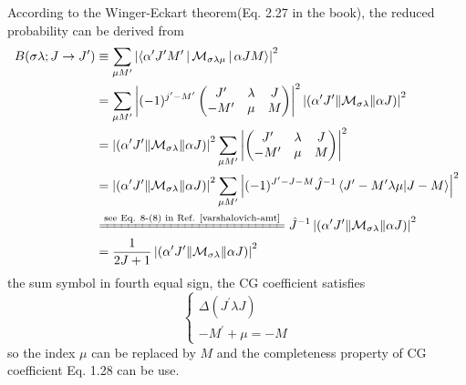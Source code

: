 \begin{exercise}
    According to the Winger-Eckart theorem(Eq. 2.27 in the book), 
    the reduced probability can be derived from
    \begin{equation}
    \begin{aligned}
        B(\sigma\lambda; J \rightarrow J^{\prime})
        &\equiv
        \sum_{\mu M^{\prime}} \left|
            \Braket{\alpha^{\prime} J^{\prime} M^{\prime} |
            \mathcal{M}_{\sigma\lambda\mu} | \alpha J M}
        \right|^2 \\
        &= \sum_{\mu M^{\prime}} \left|
        (-1)^{j^{\prime} - M^{\prime}}\begin{pmatrix}
            J^{\prime}  &  \lambda  &  J \\
            -M^{\prime} &  \mu      &  M 
        \end{pmatrix}
        \right|^2 \left|
          \left(\alpha^{\prime} J^{\prime} \| \mathcal{M}_{\sigma\lambda} \|  \alpha J\right)
        \right|^2 \\
        &= \left|
            \left(\alpha^{\prime} J^{\prime} \| \mathcal{M}_{\sigma\lambda} \|  \alpha J\right)
          \right|^2
          \sum_{\mu M^{\prime}} \left|\begin{pmatrix}
            J^{\prime}  &  \lambda  &  J \\
            -M^{\prime} &  \mu      &  M 
        \end{pmatrix}
        \right|^2  \\ 
        &= \left|
            \left(\alpha^{\prime} J^{\prime} \| \mathcal{M}_{\sigma\lambda} \|  \alpha J\right)
          \right|^2
          \sum_{\mu M^{\prime}} \left|
            (-1)^{J^{\prime} - J - M} \hat{J}^{-1}
            \braket{J^{\prime} -M^{\prime} \lambda \mu | J -M}
        \right|^2  \\
        &\xlongequal[]{\text{see Eq. 8-(8) in Ref. \cite{varshalovich-amt}}}
        \hat{J}^{-1} \left|
            \left(\alpha^{\prime} J^{\prime} \| \mathcal{M}_{\sigma\lambda} \|  \alpha J\right)
          \right|^2\\
          &=  \frac{1}{2J+1} \left|
            \left(\alpha^{\prime} J^{\prime} \| \mathcal{M}_{\sigma\lambda} \|  \alpha J\right)
          \right|^2
    \end{aligned}
    \end{equation}
    the sum symbol in fourth equal sign, the CG coefficient satisfies
    \begin{equation*}
        \left\{
            \begin{array}{c}
                \Delta(J^{\prime} \lambda J) \\
                -M^{\prime} + \mu = -M
            \end{array}
        \right.
    \end{equation*}
    so the index $\mu$ can be replaced by $M$ and the completeness
    property of CG coefficient Eq. 1.28 can be use.
    \label{exer-suhonen:ex2-25}
\end{exercise}


